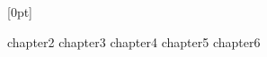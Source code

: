 \documentclass{report}
\begin{document}




  [0pt]
  {\addvspace{1em}}
  {\bfseries\chaptername\ \thecontentslabel\quad}
  {}
  {\bfseries\hfill\contentspage}
\tableofcontents


\newpage

\newpage
{}
{chapter2}
{chapter3}
{chapter4}
{chapter5}
{chapter6}
\end{document}
